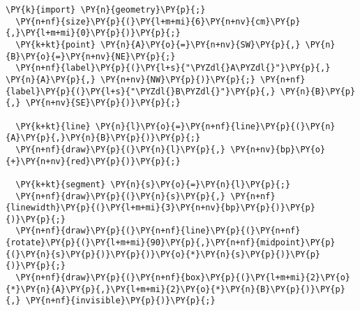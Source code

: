 \begin{Verbatim}[commandchars=\\\{\}]
  \PY{k}{import} \PY{n}{geometry}\PY{p}{;}
  \PY{n+nf}{size}\PY{p}{(}\PY{l+m+mi}{6}\PY{n+nv}{cm}\PY{p}{,}\PY{l+m+mi}{0}\PY{p}{)}\PY{p}{;}
  \PY{k+kt}{point} \PY{n}{A}\PY{o}{=}\PY{n+nv}{SW}\PY{p}{,} \PY{n}{B}\PY{o}{=}\PY{n+nv}{NE}\PY{p}{;}
  \PY{n+nf}{label}\PY{p}{(}\PY{l+s}{"\PYZdl{}A\PYZdl{}"}\PY{p}{,} \PY{n}{A}\PY{p}{,} \PY{n+nv}{NW}\PY{p}{)}\PY{p}{;} \PY{n+nf}{label}\PY{p}{(}\PY{l+s}{"\PYZdl{}B\PYZdl{}"}\PY{p}{,} \PY{n}{B}\PY{p}{,} \PY{n+nv}{SE}\PY{p}{)}\PY{p}{;}

  \PY{k+kt}{line} \PY{n}{l}\PY{o}{=}\PY{n+nf}{line}\PY{p}{(}\PY{n}{A}\PY{p}{,}\PY{n}{B}\PY{p}{)}\PY{p}{;}
  \PY{n+nf}{draw}\PY{p}{(}\PY{n}{l}\PY{p}{,} \PY{n+nv}{bp}\PY{o}{+}\PY{n+nv}{red}\PY{p}{)}\PY{p}{;}

  \PY{k+kt}{segment} \PY{n}{s}\PY{o}{=}\PY{n}{l}\PY{p}{;}
  \PY{n+nf}{draw}\PY{p}{(}\PY{n}{s}\PY{p}{,} \PY{n+nf}{linewidth}\PY{p}{(}\PY{l+m+mi}{3}\PY{n+nv}{bp}\PY{p}{)}\PY{p}{)}\PY{p}{;}
  \PY{n+nf}{draw}\PY{p}{(}\PY{n+nf}{line}\PY{p}{(}\PY{n+nf}{rotate}\PY{p}{(}\PY{l+m+mi}{90}\PY{p}{,}\PY{n+nf}{midpoint}\PY{p}{(}\PY{n}{s}\PY{p}{)}\PY{p}{)}\PY{o}{*}\PY{n}{s}\PY{p}{)}\PY{p}{)}\PY{p}{;}
  \PY{n+nf}{draw}\PY{p}{(}\PY{n+nf}{box}\PY{p}{(}\PY{l+m+mi}{2}\PY{o}{*}\PY{n}{A}\PY{p}{,}\PY{l+m+mi}{2}\PY{o}{*}\PY{n}{B}\PY{p}{)}\PY{p}{,} \PY{n+nf}{invisible}\PY{p}{)}\PY{p}{;}
\end{Verbatim}
